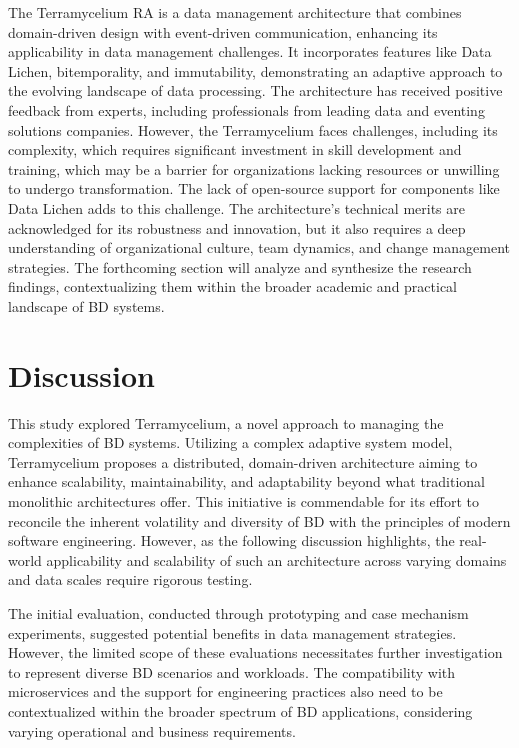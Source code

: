 \documentclass{ieeeaccess}
\begin{document}
The Terramycelium RA is a data management architecture that combines domain-driven design with event-driven communication, enhancing its applicability in data management challenges. It incorporates features like Data Lichen, bitemporality, and immutability, demonstrating an adaptive approach to the evolving landscape of data processing. The architecture has received positive feedback from experts, including professionals from leading data and eventing solutions companies. However, the Terramycelium faces challenges, including its complexity, which requires significant investment in skill development and training, which may be a barrier for organizations lacking resources or unwilling to undergo transformation. The lack of open-source support for components like Data Lichen adds to this challenge. The architecture's technical merits are acknowledged for its robustness and innovation, but it also requires a deep understanding of organizational culture, team dynamics, and change management strategies. The forthcoming section will analyze and synthesize the research findings, contextualizing them within the broader academic and practical landscape of BD systems.

\section{Discussion} \label{sec:discussion}

This study explored Terramycelium, a novel approach to managing the complexities of BD systems. Utilizing a complex adaptive system model, Terramycelium proposes a distributed, domain-driven architecture aiming to enhance scalability, maintainability, and adaptability beyond what traditional monolithic architectures offer. This initiative is commendable for its effort to reconcile the inherent volatility and diversity of BD with the principles of modern software engineering. However, as the following discussion highlights, the real-world applicability and scalability of such an architecture across varying domains and data scales require rigorous testing.

The initial evaluation, conducted through prototyping and case mechanism experiments, suggested potential benefits in data management strategies. However, the limited scope of these evaluations necessitates further investigation to represent diverse BD scenarios and workloads. The compatibility with microservices and the support for engineering practices also need to be contextualized within the broader spectrum of BD applications, considering varying operational and business requirements.
\end{document}
